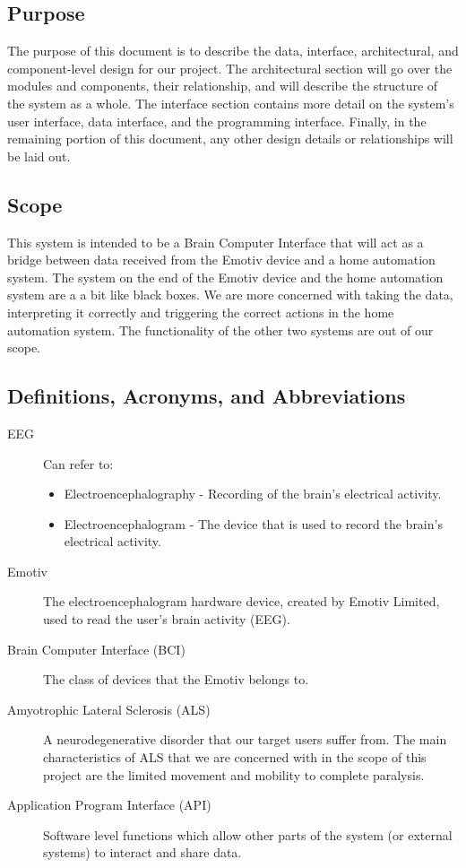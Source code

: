 \documentclass{article}
\begin{document}
\subsection{Purpose}
The purpose of this document is to describe the data, interface, architectural, and component-level design for our project. The architectural section will go over the modules and components, their relationship, and will describe the structure of the system as a whole. The interface section contains more detail on the system's user interface, data interface,  and the programming interface. Finally, in the remaining portion of this document, any other design details or relationships will be laid out.

\subsection{Scope}

This system is intended to be a Brain Computer Interface that will act as a bridge between data received from the Emotiv device and a home automation system. The system on the end of the Emotiv device and the home automation system are a a bit like black boxes. We are more concerned with taking the data, interpreting it correctly and triggering the correct actions in the home automation system. The functionality of the other two systems are out of our scope. 

\subsection{Definitions, Acronyms, and Abbreviations}
\begin{description}
    \item[EEG] Can refer to:
        \begin{itemize}
            \item Electroencephalography - Recording of the brain's electrical
                activity.
	        \item Electroencephalogram - The device that is used to record the
	            brain's electrical activity.
        \end{itemize}
    \item[Emotiv] The electroencephalogram hardware device, created by Emotiv
        Limited, used to read the user's brain activity (EEG).
    \item[Brain Computer Interface (BCI)] The class of devices that the Emotiv
        belongs to.
    \item[Amyotrophic Lateral Sclerosis (ALS)] A neurodegenerative disorder
        that our target users suffer from. The main characteristics of ALS
        that we are concerned with in the scope of this project are the
        limited movement and mobility to complete paralysis.
    \item[Application Program Interface (API)] Software level functions which
        allow other parts of the system (or external systems) to interact and 
        share data.
\end{description}
\end{document}
